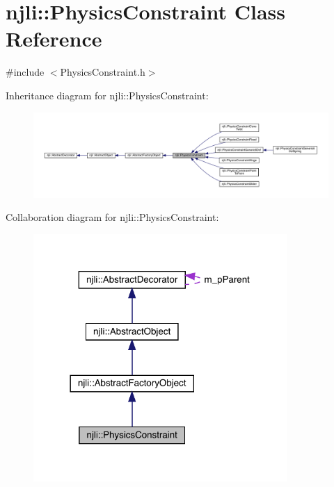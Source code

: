 \hypertarget{classnjli_1_1_physics_constraint}{}\section{njli\+:\+:Physics\+Constraint Class Reference}
\label{classnjli_1_1_physics_constraint}


{\ttfamily \#include $<$Physics\+Constraint.\+h$>$}



Inheritance diagram for njli\+:\+:Physics\+Constraint\+:\nopagebreak
\begin{figure}[H]
\begin{center}
\leavevmode
\includegraphics[width=350pt]{classnjli_1_1_physics_constraint__inherit__graph}
\end{center}
\end{figure}


Collaboration diagram for njli\+:\+:Physics\+Constraint\+:\nopagebreak
\begin{figure}[H]
\begin{center}
\leavevmode
\includegraphics[width=273pt]{classnjli_1_1_physics_constraint__coll__graph}
\end{center}
\end{figure}

